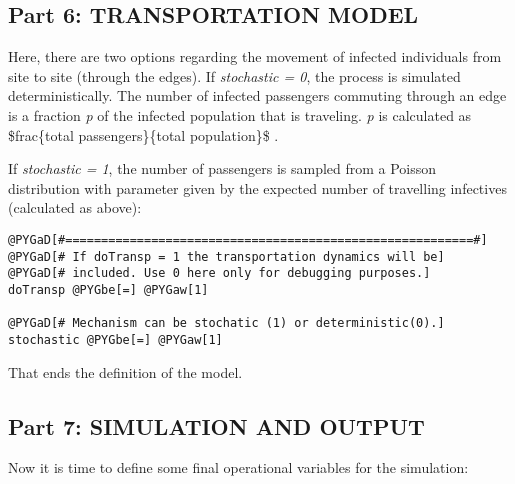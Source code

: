 \documentclass[a4paper,10pt]{manual}
\begin{document}
\subsection{Part 6: TRANSPORTATION MODEL}

Here, there are two options regarding the movement of infected individuals from site to site (through the edges). If \emph{stochastic = 0}, the process is simulated deterministically. The number of infected passengers commuting through an edge is a fraction \emph{p} of the infected population that is traveling. \emph{p} is calculated as \$frac\{total passengers\}\{total population\}\$ .

If \emph{stochastic = 1}, the number of passengers is sampled from a Poisson distribution with parameter given by the expected number of travelling infectives (calculated as above):

\begin{Verbatim}[commandchars=@\[\]]
@PYGaD[#=========================================================#]
@PYGaD[# If doTransp = 1 the transportation dynamics will be]
@PYGaD[# included. Use 0 here only for debugging purposes.]
doTransp @PYGbe[=] @PYGaw[1]

@PYGaD[# Mechanism can be stochatic (1) or deterministic(0).]
stochastic @PYGbe[=] @PYGaw[1]
\end{Verbatim}

That ends the definition of the model.


\subsection{Part 7: SIMULATION AND OUTPUT}

Now it is time to define some final operational variables for the simulation:
\end{document}
